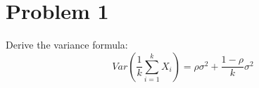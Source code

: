 \section*{Problem 1}

Derive the variance formula: \\

\[ Var(\frac{1}{k} \sum\limits_{i=1}^k X_i ) = \rho\sigma^2 + \frac{1 - \rho}{k}\sigma^2 \]

